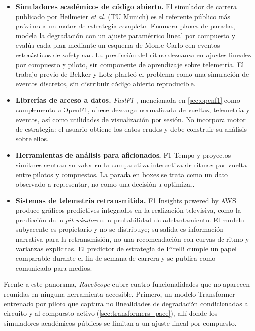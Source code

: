 \begin{itemize}
    \item \textbf{Simuladores académicos de código abierto.} El simulador de carrera publicado por Heilmeier \textit{et al.} (TU Munich) \cite{heilmeier2020montecarlo,heilmeier2020vse} es el referente público más próximo a un motor de estrategia completo. Enumera planes de paradas, modela la degradación con un ajuste paramétrico lineal por compuesto y evalúa cada plan mediante un esquema de Monte Carlo con eventos estocásticos de safety car. La predicción del ritmo descansa en ajustes lineales por compuesto y piloto, sin componente de aprendizaje sobre telemetría. El trabajo previo de Bekker y Lotz \cite{bekker2009simulation} planteó el problema como una simulación de eventos discretos, sin distribuir código abierto reproducible.

    \item \textbf{Librerías de acceso a datos.} \textit{FastF1} \cite{fastf1lib}, mencionada en \ref{sec:openf1} como complemento a OpenF1, ofrece descarga normalizada de vueltas, telemetría y eventos, así como utilidades de visualización por sesión. No incorpora motor de estrategia: el usuario obtiene los datos crudos y debe construir su análisis sobre ellos.

    \item \textbf{Herramientas de análisis para aficionados.} F1 Tempo \cite{gptempo} y proyectos similares centran su valor en la comparativa interactiva de ritmos por vuelta entre pilotos y compuestos. La parada en boxes se trata como un dato observado a representar, no como una decisión a optimizar.

    \item \textbf{Sistemas de telemetría retransmitida.} F1 Insights powered by AWS \cite{awsf1insights} produce gráficos predictivos integrados en la realización televisiva, como la predicción de la \textit{pit window} o la probabilidad de adelantamiento. El modelo subyacente es propietario y no se distribuye; su salida es información narrativa para la retransmisión, no una recomendación con curvas de ritmo y varianzas explícitas. El predictor de estrategia de Pirelli cumple un papel comparable durante el fin de semana de carrera y se publica como comunicado para medios.
\end{itemize}

Frente a este panorama, \textit{RaceScope} cubre cuatro funcionalidades que no aparecen reunidas en ninguna herramienta accesible. Primero, un modelo Transformer entrenado por piloto que captura no linealidades de degradación condicionadas al circuito y al compuesto activo (\ref{sec:transformers_pace}), allí donde los simuladores académicos públicos se limitan a un ajuste lineal por compuesto. 

